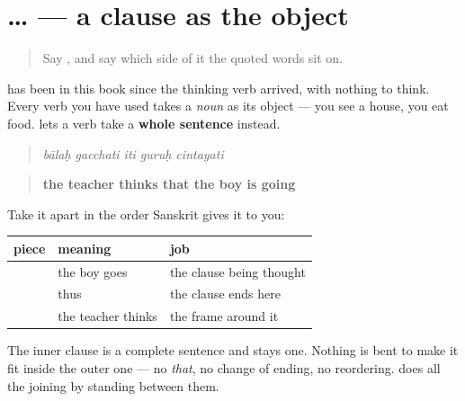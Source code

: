 \section[\texorpdfstring{… \sk{इति} \sk{चिन्तयति} (… iti cintayati)}{… इति चिन्तयति (… iti cintayati)}]{…   — a clause as the object}

\label{lesson:SA-C54-iti-clause}



\begin{quote}
Say \textbf{}, and say which side of it the quoted words sit on.
\end{quote}

\begin{grammarlens}[title={Grammar Lens: what a thinking verb thinks}]
\textbf{} has been in this book since the thinking verb arrived, with nothing to think. Every verb you have used takes a \emph{noun} as its object — you see a house, you eat food. \textbf{} lets a verb take a \textbf{whole sentence} instead.

\begin{quote}
\textbf{    }
\end{quote}

\begin{quote}
\emph{bālaḥ gacchati iti guruḥ cintayati}
\end{quote}

\begin{quote}
\textbf{the teacher thinks that the boy is going}
\end{quote}

Take it apart in the order Sanskrit gives it to you:

\noindent
\begin{tabularx}{\linewidth}{@{}>{\raggedright\arraybackslash}X>{\raggedright\arraybackslash}X>{\raggedright\arraybackslash}X@{}}
\toprule
\textbf{piece} & \textbf{meaning} & \textbf{job} \\
\midrule
\textbf{\sk{बालः} \sk{गच्छति}} & the boy goes & the clause being thought \\
\textbf{\sk{इति}} & thus & the clause ends here \\
\textbf{\sk{गुरुः} \sk{चिन्तयति}} & the teacher thinks & the frame around it \\
\bottomrule
\end{tabularx}

The inner clause is a complete sentence and stays one. Nothing is bent to make it fit inside the outer one — no \emph{that}, no change of ending, no reordering. \textbf{} does all the joining by standing between them.


\end{grammarlens}
